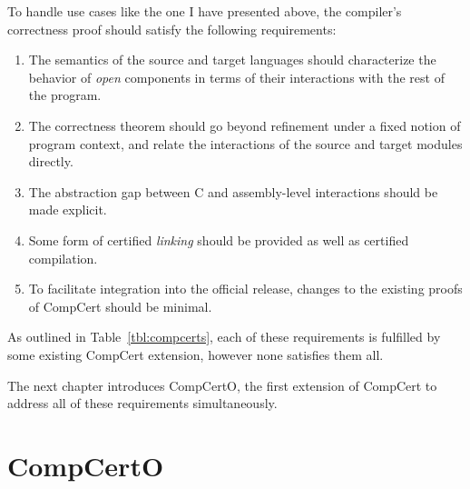 \documentclass[11pt,oneside]{book}
\theoremstyle{definition}
\begin{document}

To handle use cases like the one I have presented above,
the compiler's correctness proof
should satisfy the following requirements:
\begin{enumerate}
\item \label{req:opensem}
  The semantics of the source and target languages
  should characterize the behavior of \emph{open} components
  in terms of their interactions with the rest of the program.
\item \label{req:opensim}
  The correctness theorem
  should go beyond refinement under a fixed notion of program context, and relate
  the interactions of the source and target modules directly.
\item \label{req:openabs}
  The abstraction gap between C and assembly-level
  interactions should be made explicit.
\item \label{req:linking}
  Some form of certified \emph{linking}
  should be provided as well as certified compilation.
\item \label{req:complexity}
  To facilitate integration into the official release,
  changes to the existing proofs of CompCert
  should be minimal.
\end{enumerate}
As outlined in Table~\ref{tbl:compcerts},
each of these requirements is fulfilled
by some existing CompCert extension,
however none satisfies them all.

The next chapter introduces CompCertO,
the first extension of CompCert to address
all of these requirements simultaneously.





\chapter{CompCertO} \label{sec:compcerto} %
\end{document}
